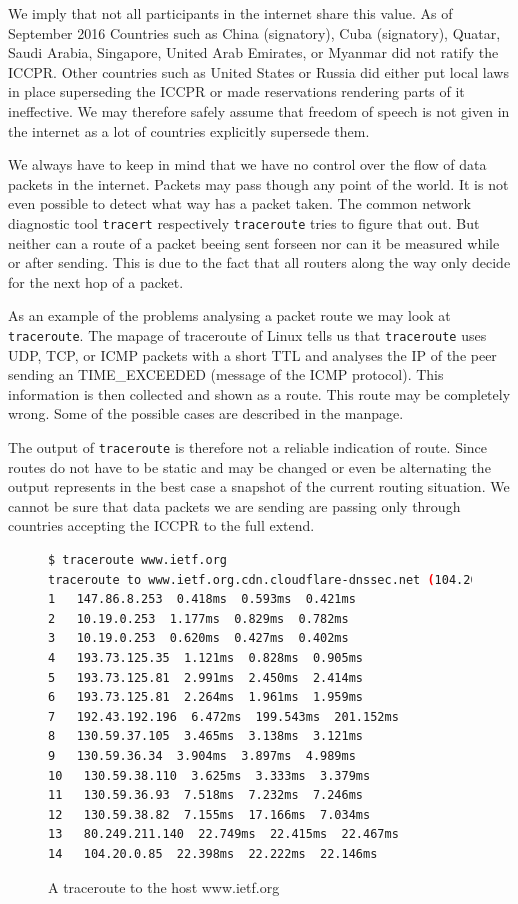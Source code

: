 We imply that not all participants in the internet share this value. As of September  2016 Countries such as China (signatory), Cuba (signatory), Quatar, Saudi Arabia, Singapore, United Arab Emirates, or Myanmar did not ratify the ICCPR. Other countries such as United States or Russia did either put local laws in place superseding the ICCPR or made reservations rendering parts of it ineffective. We may therefore safely assume that freedom of speech is not given in the internet as a lot of countries explicitly supersede them.

We always have to keep in mind that we have no control over the flow of data packets in the internet. Packets may pass though any point of the world. It is not even possible to detect what way has a packet taken. The common network diagnostic tool \verb|tracert| respectively \verb|traceroute| tries to figure that out. But neither can a route of a packet beeing sent forseen nor can it be measured while or after sending. This is due to the fact that all routers along the way only decide for the next hop of a packet.

As an example of the problems analysing a packet route we may look at \verb|traceroute|. The mapage of traceroute of Linux tells us that \verb|traceroute| uses UDP, TCP, or ICMP packets with a short TTL and analyses the IP of the peer sending an TIME\_EXCEEDED (message of the ICMP protocol). This information is then collected and shown as a route. This route may be completely wrong. Some of the possible cases are described in the manpage.

The output of \verb|traceroute| is therefore not a reliable indication of route. Since routes do not have to be static and may be changed or even be alternating the output represents in the best case a snapshot of the current routing situation. We cannot be sure that data packets we are sending are passing only through countries accepting the ICCPR to the full extend.
\begin{figure}[H]
	\begin{lstlisting}[language=bash,breaklines=true,prebreak={\mbox{\quad$\rhookswarrow$}},basicstyle=\tiny]
$ traceroute www.ietf.org
traceroute to www.ietf.org.cdn.cloudflare-dnssec.net (104.20.0.85), 64 hops max
1   147.86.8.253  0.418ms  0.593ms  0.421ms
2   10.19.0.253  1.177ms  0.829ms  0.782ms
3   10.19.0.253  0.620ms  0.427ms  0.402ms
4   193.73.125.35  1.121ms  0.828ms  0.905ms
5   193.73.125.81  2.991ms  2.450ms  2.414ms
6   193.73.125.81  2.264ms  1.961ms  1.959ms
7   192.43.192.196  6.472ms  199.543ms  201.152ms
8   130.59.37.105  3.465ms  3.138ms  3.121ms
9   130.59.36.34  3.904ms  3.897ms  4.989ms
10   130.59.38.110  3.625ms  3.333ms  3.379ms
11   130.59.36.93  7.518ms  7.232ms  7.246ms
12   130.59.38.82  7.155ms  17.166ms  7.034ms
13   80.249.211.140  22.749ms  22.415ms  22.467ms
14   104.20.0.85  22.398ms  22.222ms  22.146ms
	\end{lstlisting}
	\caption{A traceroute to the host www.ietf.org}
\end{figure}

